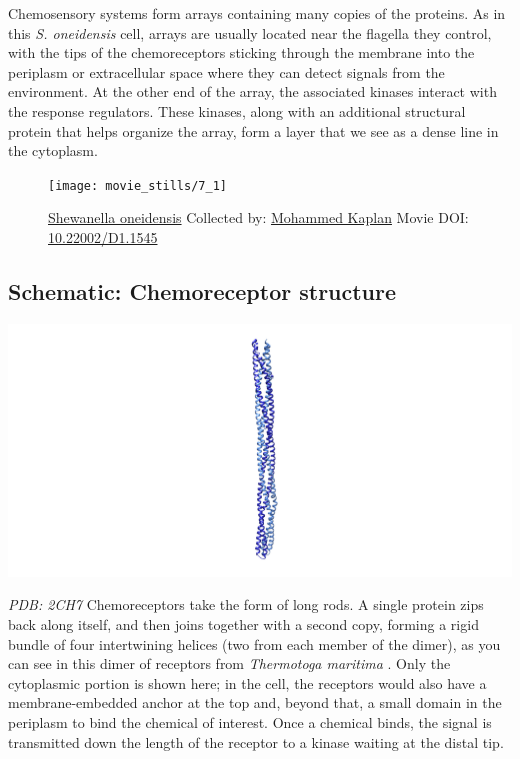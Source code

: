 \documentclass[]{tufte-book}
\begin{document}
Chemosensory systems form arrays containing many copies of the proteins.
As in this \emph{S. oneidensis} cell, arrays are usually located near
the flagella they control, with the tips of the chemoreceptors sticking
through the membrane into the periplasm or extracellular space where
they can detect signals from the environment. At the other end of the
array, the associated kinases interact with the response regulators.
These kinases, along with an additional structural protein that helps
organize the array, form a layer that we see as a dense line in the
cytoplasm.





\begin{figure}
\texttt{[image: movie\_stills/7\_1]} \caption[\protect\hyperlink{tree}{Shewanella oneidensis} Collected by:
\protect\hyperlink{mohammed_kaplan}{Mohammed Kaplan} Movie DOI:
\href{https://doi.org/10.22002/D1.1545}{10.22002/D1.1545}]{\protect\hyperlink{tree}{Shewanella oneidensis} Collected by:
\protect\hyperlink{mohammed_kaplan}{Mohammed Kaplan} Movie DOI:
\href{https://doi.org/10.22002/D1.1545}{10.22002/D1.1545}}\label{fig:7-1}
\end{figure}

\hypertarget{Chemoreceptor_structure}{\subsection*{Schematic:
Chemoreceptor structure}\label{Chemoreceptor_structure}}

\includegraphics{img/schematics/7_1_1}

\emph{PDB: 2CH7} Chemoreceptors take the form of long rods. A single
protein zips back along itself, and then joins together with a second
copy, forming a rigid bundle of four intertwining helices (two from each
member of the dimer), as you can see in this dimer of receptors from
\emph{Thermotoga maritima} \citep{park2006}. Only the cytoplasmic
portion is shown here; in the cell, the receptors would also have a
membrane-embedded anchor at the top and, beyond that, a small domain in
the periplasm to bind the chemical of interest. Once a chemical binds,
the signal is transmitted down the length of the receptor to a kinase
waiting at the distal tip.
\end{document}
